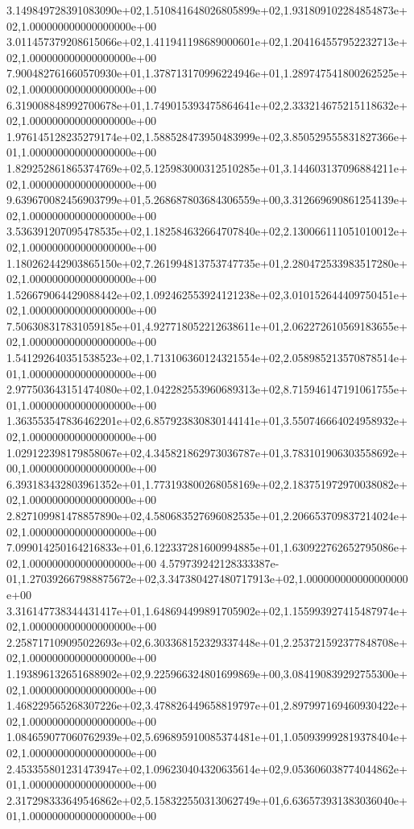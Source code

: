 3.149849728391083090e+02,1.510841648026805899e+02,1.931809102284854873e+02,1.000000000000000000e+00
3.011457379208615066e+02,1.411941198689000601e+02,1.204164557952232713e+02,1.000000000000000000e+00
7.900482761660570930e+01,1.378713170996224946e+01,1.289747541800262525e+02,1.000000000000000000e+00
6.319008848992700678e+01,1.749015393475864641e+02,2.333214675215118632e+02,1.000000000000000000e+00
1.976145128235279174e+02,1.588528473950483999e+02,3.850529555831827366e+01,1.000000000000000000e+00
1.829252861865374769e+02,5.125983000312510285e+01,3.144603137096884211e+02,1.000000000000000000e+00
9.639670082456903799e+01,5.268687803684306559e+00,3.312669690861254139e+02,1.000000000000000000e+00
3.536391207095478535e+02,1.182584632664707840e+02,2.130066111051010012e+02,1.000000000000000000e+00
1.180262442903865150e+02,7.261994813753747735e+01,2.280472533983517280e+02,1.000000000000000000e+00
1.526679064429088442e+02,1.092462553924121238e+02,3.010152644409750451e+02,1.000000000000000000e+00
7.506308317831059185e+01,4.927718052212638611e+01,2.062272610569183655e+02,1.000000000000000000e+00
1.541292640351538523e+02,1.713106360124321554e+02,2.058985213570878514e+01,1.000000000000000000e+00
2.977503643151474080e+02,1.042282553960689313e+02,8.715946147191061755e+01,1.000000000000000000e+00
1.363553547836462201e+02,6.857923830830144141e+01,3.550746664024958932e+02,1.000000000000000000e+00
1.029122398179858067e+02,4.345821862973036787e+01,3.783101906303558692e+00,1.000000000000000000e+00
6.393183432803961352e+01,1.773193800268058169e+02,2.183751972970038082e+02,1.000000000000000000e+00
2.827109981478857890e+02,4.580683527696082535e+01,2.206653709837214024e+02,1.000000000000000000e+00
7.099014250164216833e+01,6.122337281600994885e+01,1.630922762652795086e+02,1.000000000000000000e+00
4.579739242128333387e-01,1.270392667988875672e+02,3.347380427480717913e+02,1.000000000000000000e+00
3.316147738344431417e+01,1.648694499891705902e+02,1.155993927415487974e+02,1.000000000000000000e+00
2.258717109095022693e+02,6.303368152329337448e+01,2.253721592377848708e+02,1.000000000000000000e+00
1.193896132651688902e+02,9.225966324801699869e+00,3.084190839292755300e+02,1.000000000000000000e+00
1.468229565268307226e+02,3.478826449658819797e+01,2.897997169460930422e+02,1.000000000000000000e+00
1.084659077060762939e+02,5.696895910085374481e+01,1.050939992819378404e+02,1.000000000000000000e+00
2.453355801231473947e+02,1.096230404320635614e+02,9.053606038774044862e+01,1.000000000000000000e+00
2.317298333649546862e+02,5.158322550313062749e+01,6.636573931383036040e+01,1.000000000000000000e+00
